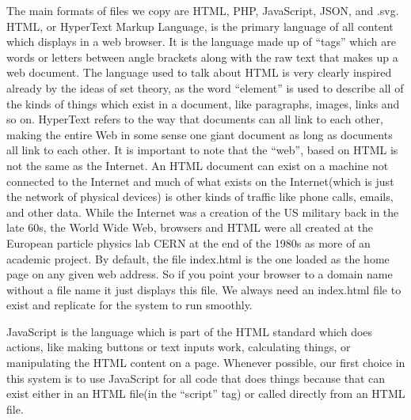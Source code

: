 The main formats of files we copy are HTML, PHP, JavaScript, JSON, and
.svg. HTML, or HyperText Markup Language, is the primary language of all
content which displays in a web browser. It is the language made up of
``tags'' which are words or letters between angle brackets along with
the raw text that makes up a web document. The language used to talk
about HTML is very clearly inspired already by the ideas of set theory,
as the word ``element'' is used to describe all of the kinds of things
which exist in a document, like paragraphs, images, links and so on.
HyperText refers to the way that documents can all link to each other,
making the entire Web in some sense one giant document as long as
documents all link to each other. It is important to note that the
``web'', based on HTML is not the same as the Internet. An HTML document
can exist on a machine not connected to the Internet and much of what
exists on the Internet(which is just the network of physical devices) is
other kinds of traffic like phone calls, emails, and other data. While
the Internet was a creation of the US military back in the late 60s, the
World Wide Web, browsers and HTML were all created at the European
particle physics lab CERN at the end of the 1980s as more of an academic
project. By default, the file index.html is the one loaded as the home
page on any given web address. So if you point your browser to a domain
name without a file name it just displays this file. We always need an
index.html file to exist and replicate for the system to run smoothly.

JavaScript is the language which is part of the HTML standard which does
actions, like making buttons or text inputs work, calculating things, or
manipulating the HTML content on a page. Whenever possible, our first
choice in this system is to use JavaScript for all code that does things
because that can exist either in an HTML file(in the ``script'' tag) or
called directly from an HTML file.

